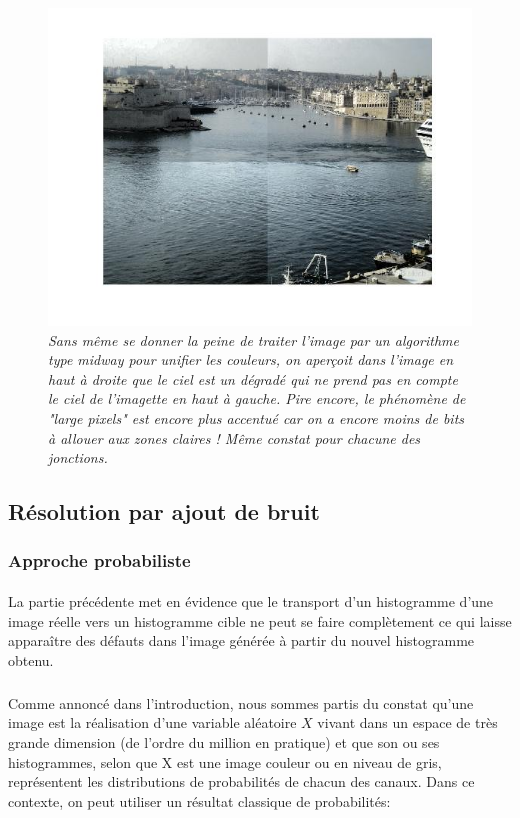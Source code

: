 \documentclass{article}
\begin{document}
\begin{figure}
\centering
\includegraphics[scale=0.75]{images/p2_tilling.jpg}
\caption{\textit{Sans même se donner la peine de traiter l'image par un algorithme type midway pour unifier les couleurs, on aperçoit dans l'image en haut à droite que le ciel est un dégradé qui ne prend pas en compte le ciel de l'imagette en haut à gauche. Pire encore, le phénomène de "large pixels" est encore plus accentué car on a encore moins de bits à allouer aux zones claires ! Même constat pour chacune des jonctions.}}
\label{fig:tilling}
\end{figure}

\subsection*{Résolution par ajout de bruit}
\subsubsection*{Approche probabiliste}
\paragraph*{}
La partie précédente met en évidence que le transport d'un histogramme d'une image réelle vers un histogramme cible ne peut se faire complètement ce qui laisse apparaître des défauts dans l'image générée à partir du nouvel histogramme obtenu.
\subparagraph*{}
Comme annoncé dans l'introduction, nous sommes partis du constat qu'une image est la réalisation d'une variable aléatoire $X$ vivant dans un espace de très grande dimension (de l'ordre du million en pratique) et que son ou ses histogrammes, selon que X est une image couleur ou en niveau de gris, représentent les distributions de probabilités de chacun des canaux. Dans ce contexte, on peut utiliser un résultat classique de probabilités:
\end{document}
